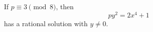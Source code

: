 \begin{proposition}
    If $p\equiv3\pmod8$, then
\[
    py^2=2x^4+1
\]
    has a rational solution with $y\ne0$.
\end{proposition}
